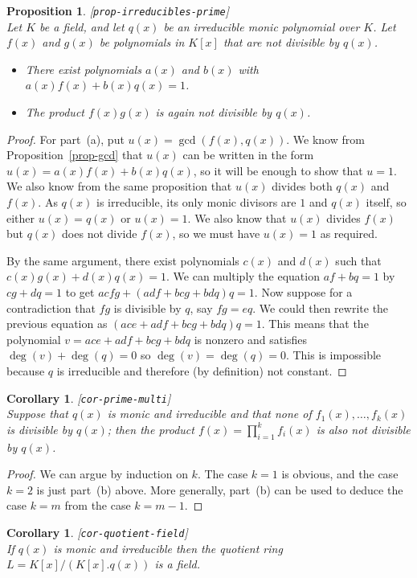 \documentclass{amsart}
\newcommand{\lbl}[1]{\label{#1}\textup{[\texttt{#1}]}\ \\}
\newcommand{\lbl}{\label}
\renewcommand{\:}{\colon}
\newtheorem{proposition}[theorem]{Proposition}
\newtheorem{corollary}[theorem]{Corollary}
\theoremstyle{definition}
\begin{document}
\begin{proposition}\lbl{prop-irreducibles-prime}
 Let $K$ be a field, and let $q(x)$ be an irreducible monic polynomial
 over $K$.  Let $f(x)$ and $g(x)$ be polynomials in $K[x]$ that are
 not divisible by $q(x)$.
 \begin{itemize}
  \item[(a)] There exist polynomials $a(x)$ and $b(x)$ with
   $a(x)f(x)+b(x)q(x)=1$.  
  \item[(b)] The product $f(x)g(x)$ is again not divisible by $q(x)$.   
 \end{itemize}
\end{proposition}
\begin{proof}
 For part~(a), put $u(x)=\gcd(f(x),q(x))$.  We know from
 Proposition~\ref{prop-gcd} that $u(x)$ can be written in the form
 $u(x)=a(x)f(x)+b(x)q(x)$, so it will be enough to show that $u=1$.
 We also know from the same proposition that $u(x)$ divides both
 $q(x)$ and $f(x)$.  As $q(x)$ is irreducible, its only monic divisors
 are $1$ and $q(x)$ itself, so either $u(x)=q(x)$ or $u(x)=1$.  We
 also know that $u(x)$ divides $f(x)$ but $q(x)$ does not divide
 $f(x)$, so we must have $u(x)=1$ as required.

 By the same argument, there exist polynomials $c(x)$ and $d(x)$ such
 that $c(x)g(x)+d(x)q(x)=1$.  We can multiply the equation $af+bq=1$
 by $cg+dq=1$ to get $acfg+(adf+bcg+bdq)q=1$.  Now suppose for a
 contradiction that $fg$ is divisible by $q$, say $fg=eq$.  We could
 then rewrite the previous equation as $(ace+adf+bcg+bdq)q=1$.
 This means that the polynomial $v=ace+adf+bcg+bdq$ is nonzero and
 satisfies $\deg(v)+\deg(q)=0$ so $\deg(v)=\deg(q)=0$.  This is
 impossible because $q$ is irreducible and therefore (by definition)
 not constant.
\end{proof}
\begin{corollary}\lbl{cor-prime-multi}
 Suppose that $q(x)$ is monic and irreducible and that none of
 $f_1(x),\dotsc,f_k(x)$ is divisible by $q(x)$; then the product
 $f(x)=\prod_{i=1}^kf_i(x)$ is also not divisible by $q(x)$.
\end{corollary}
\begin{proof}
 We can argue by induction on $k$.  The case $k=1$ is obvious, and the 
 case $k=2$ is just part~(b) above.  More generally, part~(b) can be
 used to deduce the case $k=m$ from the case $k=m-1$.
\end{proof}
\begin{corollary}\lbl{cor-quotient-field}
 If $q(x)$ is monic and irreducible then the quotient ring
 $L=K[x]/(K[x].q(x))$ is a field.
\end{corollary}
\end{document}
